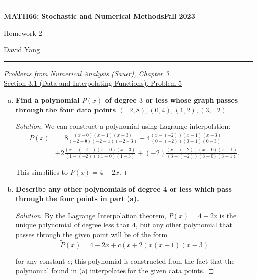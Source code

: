 \documentclass[11pt]{article}
\newenvironment{solution}
  {\renewcommand\qedsymbol{$\blacksquare$}\begin{proof}[Solution]}
  {\end{proof}}
\theoremstyle{definition}
\begin{document}
	\hrule
	\begin{center}
        \textbf{MATH66: Stochastic and Numerical Methods}\hfill \textbf{Fall 2023}\newline

		{\Large Homework 2}

		David Yang
	\end{center}

\hrule

\vspace{1em}

\textit{Problems from Numerical Analysis (Sauer), Chapter 3.} \\

\underline{Section 3.1 (Data and Interpolating Functions), Problem 5} \\

\begin{enumerate}[a)]
    \item \textbf{Find a polynomial $P(x)$ of degree $3$ or less whose graph passes through the four data points $(-2, 8), (0, 4), (1, 2), (3, -2)$.}
    
    \begin{solution}
    We can construct a polynomial using Lagrange interpolation:
    \begin{align*}
         P(x) &= 8\frac{(x-0)(x-1)(x-3)}{(-2-0)(-2-1)(-2-3)} + 4\frac{(x-(-2))(x-1)(x-3)}{(0-(-2))(0-1)(0-3)} \\
         &+  2\frac{(x-(-2))(x-0)(x-3)}{(1-(-2))(1-0)(1-3)}  + (-2)\frac{(x-(-2))(x-0)(x-1)}{(3-(-2))(3-0)(3-1)}.\end{align*}
    
    This simplifies to $\boxed{P(x) = 4-2x}$.
    \end{solution}
    
    \item \textbf{Describe any other polynomials of degree 4 or less which pass through the four points in part (a).}
  
    \begin{solution}
        By the Lagrange Interpolation theorem, $P(x) = 4-2x$ is the unique polynomial of degree less than $4$, but any other polynomial that passes through the given point will be of the form
        \[ \boxed{\tilde{P}(x) = 4-2x + c(x+2)x(x-1)(x-3)} \]
    
        for any constant $c$; this polynomial is constructed from the fact that the polynomial found in (a) interpolates for the given data points.
    \end{solution}
\end{enumerate}
\end{document}
